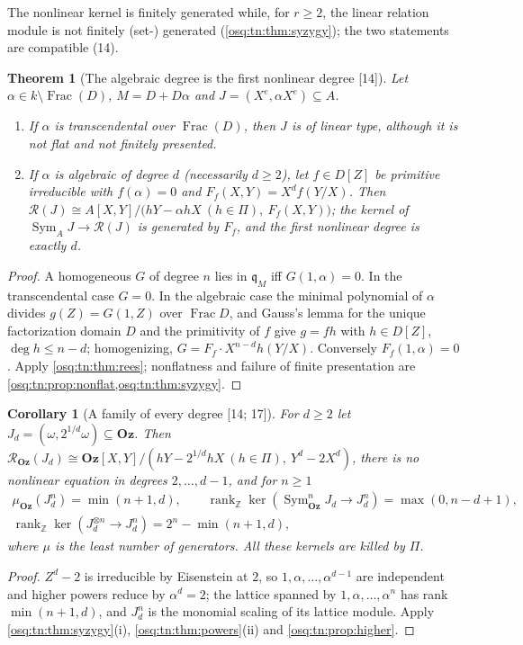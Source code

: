 \documentclass[11pt,letterpaper]{article}
\numberwithin{equation}{section}
\newtheorem{theorem}{Theorem}[section]
\newtheorem{corollary}[corollary]{Corollary}
\theoremstyle{definition}
\theoremstyle{remark}
\theoremstyle{plain}
\newcommand{\Oz}{\mathbf{Oz}}
\newcommand{\Z}{\mathbb Z}
\newcommand{\Frac}{\operatorname{Frac}}
\newcommand{\rk}{\operatorname{rank}}
\newcommand{\src}[1]{\textup{\textsf{[#1]}}}
\begin{document}
The nonlinear kernel is finitely generated while, for $r\ge2$, the linear relation module is not finitely (set-) generated
(\cref{osq:tn:thm:syzygy}); the two statements are compatible (14).

\begin{theorem}[The algebraic degree is the first nonlinear degree \src{14}]\label{osq:tn:thm:degree}
Let $\alpha\in k\setminus\Frac(D)$, $M=D+D\alpha$ and $J=(X^e,\alpha X^e)\subseteq A$.
\begin{enumerate}
\item If $\alpha$ is transcendental over $\Frac(D)$, then $J$ is of linear type, although it is not flat and not finitely presented.
\item If $\alpha$ is algebraic of degree $d$ (necessarily $d\ge2$), let $f\in D[Z]$ be primitive irreducible with $f(\alpha)=0$ and
$F_f(X,Y)=X^df(Y/X)$. Then $\mathcal R(J)\cong A[X,Y]/\bigl(hY-\alpha hX\ (h\in\Pi),\ F_f(X,Y)\bigr)$; the kernel of
$\operatorname{Sym}_AJ\to\mathcal R(J)$ is generated by $F_f$, and the first nonlinear degree is exactly $d$.
\end{enumerate}
\end{theorem}
\begin{proof}
A homogeneous $G$ of degree $n$ lies in $\mathfrak q_M$ iff $G(1,\alpha)=0$. In the transcendental case $G=0$. In the algebraic case the
minimal polynomial of $\alpha$ divides $g(Z)=G(1,Z)$ over $\Frac D$, and Gauss's lemma for the unique factorization domain $D$ and the
primitivity of $f$ give $g=fh$ with $h\in D[Z]$, $\deg h\le n-d$; homogenizing, $G=F_f\cdot X^{n-d}h(Y/X)$. Conversely $F_f(1,\alpha)=0$.
Apply \cref{osq:tn:thm:rees}; nonflatness and failure of finite presentation are \cref{osq:tn:prop:nonflat,osq:tn:thm:syzygy}.
\end{proof}

\begin{corollary}[A family of every degree \src{14; 17}]\label{osq:tn:cor:alldegrees}
For $d\ge2$ let $J_d=(\omega,2^{1/d}\omega)\subseteq\Oz$. Then
$\mathcal R_{\Oz}(J_d)\cong\Oz[X,Y]/(hY-2^{1/d}hX\ (h\in\Pi),\ Y^d-2X^d)$, there is no nonlinear equation in degrees $2,\dots,d-1$, and
for $n\ge1$
\begin{gather*}
 \mu_{\Oz}(J_d^n)=\min(n+1,d),\qquad
 \rk_\Z\ker(\operatorname{Sym}^n_{\Oz}J_d\to J_d^n)=\max(0,n-d+1),\\
 \rk_\Z\ker(J_d^{\otimes n}\to J_d^n)=2^n-\min(n+1,d),
\end{gather*}
where $\mu$ is the least number of generators. All these kernels are killed by $\Pi$.
\end{corollary}
\begin{proof}
$Z^d-2$ is irreducible by Eisenstein at $2$, so $1,\alpha,\dots,\alpha^{d-1}$ are independent and higher powers reduce by $\alpha^d=2$; the
lattice spanned by $1,\alpha,\dots,\alpha^n$ has rank $\min(n+1,d)$, and $J_d^n$ is the monomial scaling of its lattice module. Apply
\cref{osq:tn:thm:syzygy}(i), \cref{osq:tn:thm:powers}(ii) and \cref{osq:tn:prop:higher}.
\end{proof}
\end{document}
